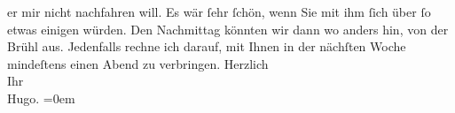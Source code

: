 \begin{ledgroupsized}[t]{13cm}
               er mir nicht nachfahren will. Es wär ſehr ſchön, wenn Sie mit ihm ſich über ſo etwas
               einigen würden. Den Nachmittag könnten wir dann wo anders hin, von der Brühl aus.\pend
           \pstart
           {\pb}Jedenfalls rechne ich darauf, mit
               Ihnen in der nächſten Woche mindeſtens einen Abend zu verbringen.\pend
           \pstart
           Herzlich{\\[\baselineskip]} Ihr{\\[\baselineskip]}\spacefill\mbox{Hugo.}\pend
           \leftskip=0em{}
         
         \endnumbering{}\end{ledgroupsized}  \newcommand{\dateiname}{L00434}\newcommand{\titel}{Hugo von Hofmannsthal an Arthur Schnitzler, [28. 4. 1895]}\newcommand{\editorInnen}{Martin Anton Müller und Gerd-Hermann Susen}
      